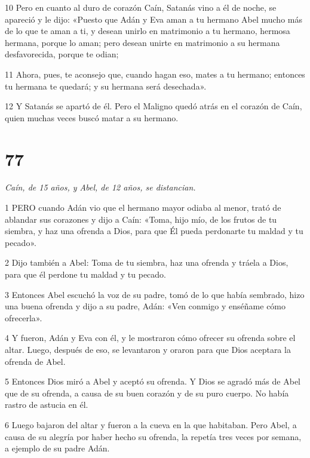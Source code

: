 \par 10 Pero en cuanto al duro de corazón Caín, Satanás vino a él de noche, se apareció y le dijo: «Puesto que Adán y Eva aman a tu hermano Abel mucho más de lo que te aman a ti, y desean unirlo en matrimonio a tu hermano, hermosa hermana, porque lo aman; pero desean unirte en matrimonio a su hermana desfavorecida, porque te odian;

\par 11 Ahora, pues, te aconsejo que, cuando hagan eso, mates a tu hermano; entonces tu hermana te quedará; y su hermana será desechada».

\par 12 Y Satanás se apartó de él. Pero el Maligno quedó atrás en el corazón de Caín, quien muchas veces buscó matar a su hermano.



\chapter{77}

\par \textit{Caín, de 15 años, y Abel, de 12 años, se distancian.}

\par 1 PERO cuando Adán vio que el hermano mayor odiaba al menor, trató de ablandar sus corazones y dijo a Caín: «Toma, hijo mío, de los frutos de tu siembra, y haz una ofrenda a Dios, para que Él pueda perdonarte tu maldad y tu pecado».

\par 2 Dijo también a Abel: Toma de tu siembra, haz una ofrenda y tráela a Dios, para que él perdone tu maldad y tu pecado.

\par 3 Entonces Abel escuchó la voz de su padre, tomó de lo que había sembrado, hizo una buena ofrenda y dijo a su padre, Adán: «Ven conmigo y enséñame cómo ofrecerla».

\par 4 Y fueron, Adán y Eva con él, y le mostraron cómo ofrecer su ofrenda sobre el altar. Luego, después de eso, se levantaron y oraron para que Dios aceptara la ofrenda de Abel.

\par 5 Entonces Dios miró a Abel y aceptó su ofrenda. Y Dios se agradó más de Abel que de su ofrenda, a causa de su buen corazón y de su puro cuerpo. No había rastro de astucia en él.

\par 6 Luego bajaron del altar y fueron a la cueva en la que habitaban. Pero Abel, a causa de su alegría por haber hecho su ofrenda, la repetía tres veces por semana, a ejemplo de su padre Adán.

